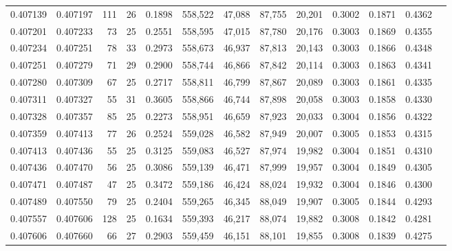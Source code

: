 \begin{tabular}{rrrrrrrrrrrrr}
0.407139 & 0.407197 &   111 &  26 &                                     0.1898 & 558,522 &  47,088 &  87,755 &  20,201 & 0.3002 & 0.1871 & 0.4362 \\
0.407201 & 0.407233 &    73 &  25 &                                     0.2551 & 558,595 &  47,015 &  87,780 &  20,176 & 0.3003 & 0.1869 & 0.4355 \\
0.407234 & 0.407251 &    78 &  33 &                                     0.2973 & 558,673 &  46,937 &  87,813 &  20,143 & 0.3003 & 0.1866 & 0.4348 \\
0.407251 & 0.407279 &    71 &  29 &                                     0.2900 & 558,744 &  46,866 &  87,842 &  20,114 & 0.3003 & 0.1863 & 0.4341 \\
0.407280 & 0.407309 &    67 &  25 &                                     0.2717 & 558,811 &  46,799 &  87,867 &  20,089 & 0.3003 & 0.1861 & 0.4335 \\
0.407311 & 0.407327 &    55 &  31 &                                     0.3605 & 558,866 &  46,744 &  87,898 &  20,058 & 0.3003 & 0.1858 & 0.4330 \\
0.407328 & 0.407357 &    85 &  25 &                                     0.2273 & 558,951 &  46,659 &  87,923 &  20,033 & 0.3004 & 0.1856 & 0.4322 \\
0.407359 & 0.407413 &    77 &  26 &                                     0.2524 & 559,028 &  46,582 &  87,949 &  20,007 & 0.3005 & 0.1853 & 0.4315 \\
0.407413 & 0.407436 &    55 &  25 &                                     0.3125 & 559,083 &  46,527 &  87,974 &  19,982 & 0.3004 & 0.1851 & 0.4310 \\
0.407436 & 0.407470 &    56 &  25 &                                     0.3086 & 559,139 &  46,471 &  87,999 &  19,957 & 0.3004 & 0.1849 & 0.4305 \\
0.407471 & 0.407487 &    47 &  25 &                                     0.3472 & 559,186 &  46,424 &  88,024 &  19,932 & 0.3004 & 0.1846 & 0.4300 \\
0.407489 & 0.407550 &    79 &  25 &                                     0.2404 & 559,265 &  46,345 &  88,049 &  19,907 & 0.3005 & 0.1844 & 0.4293 \\
0.407557 & 0.407606 &   128 &  25 &                                     0.1634 & 559,393 &  46,217 &  88,074 &  19,882 & 0.3008 & 0.1842 & 0.4281 \\
0.407606 & 0.407660 &    66 &  27 &                                     0.2903 & 559,459 &  46,151 &  88,101 &  19,855 & 0.3008 & 0.1839 & 0.4275 \\

\end{tabular}
